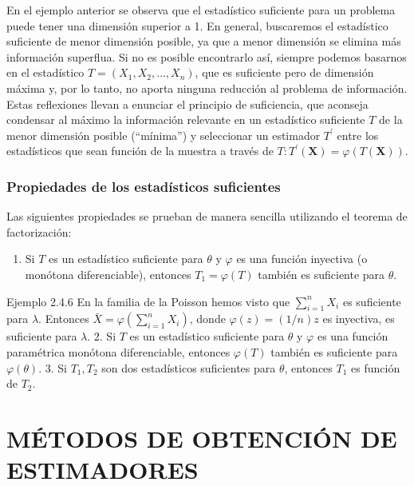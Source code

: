 \documentclass[
]{article}
\providecommand{\tightlist}{%
  \setlength{\itemsep}{0pt}\setlength{\parskip}{0pt}}
\begin{document}
En el ejemplo anterior se observa que el estadístico suficiente para un problema puede tener una dimensión superior a 1. En general, buscaremos el estadístico suficiente de menor dimensión posible, ya que a menor dimensión se elimina más información superflua. Si no es posible encontrarlo así, siempre podemos basarnos en el estadístico \(T=\left(X_{1}, X_{2}, \ldots, X_{n}\right)\), que es suficiente pero de dimensión máxima y, por lo tanto, no aporta ninguna reducción al problema de información. Estas reflexiones llevan a enunciar el principio de suficiencia, que aconseja condensar al máximo la información relevante en un estadístico suficiente \(T\) de la menor dimensión posible (``mínima'') y seleccionar un estimador \(T^{\prime}\) entre los estadísticos que sean función de la muestra a través de \(T: T^{\prime}(\mathbf{X})=\varphi(T(\mathbf{X}))\).

\subsubsection{Propiedades de los estadísticos suficientes}\label{propiedades-de-los-estaduxedsticos-suficientes}

Las siguientes propiedades se prueban de manera sencilla utilizando el teorema de factorización:

\begin{enumerate}
\def\labelenumi{\arabic{enumi}.}
\tightlist
\item
  Si \(T\) es un estadístico suficiente para \(\theta\) y \(\varphi\) es una función inyectiva (o monótona diferenciable), entonces \(T_{1}=\varphi(T)\) también es suficiente para \(\theta\).
\end{enumerate}

Ejemplo 2.4.6 En la familia de la Poisson hemos visto que \(\sum_{i=1}^{n} X_{i}\) es suficiente para \(\lambda\). Entonces \(\bar{X}=\varphi\left(\sum_{i=1}^{n} X_{i}\right)\), donde \(\varphi(z)=(1 / n) z\) es inyectiva, es suficiente para \(\lambda\).
2. Si \(T\) es un estadístico suficiente para \(\theta\) y \(\varphi\) es una función paramétrica monótona diferenciable, entonces \(\varphi(T)\) también es suficiente para \(\varphi(\theta)\).
3. Si \(T_{1}, T_{2}\) son dos estadísticos suficientes para \(\theta\), entonces \(T_{1}\) es función de \(T_{2}\).

\section{MÉTODOS DE OBTENCIÓN DE ESTIMADORES}\label{muxe9todos-de-obtenciuxf3n-de-estimadores}
\end{document}
